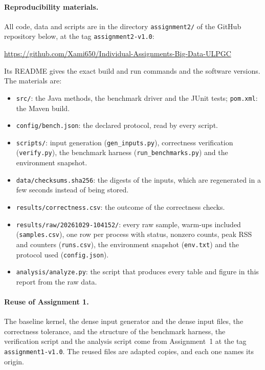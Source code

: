 \documentclass[11pt,a4paper]{article}
\newcommand{\repourl}{\url{https://github.com/Xami650/Individual-Assignments-Big-Data-ULPGC}}
\newcommand{\session}{\texttt{20261029-104152}}
\begin{document}
\paragraph{Reproducibility materials.} All code, data and scripts are in the
directory \texttt{assignment2/} of the GitHub repository below, at the tag
\texttt{assignment2-v1.0}:
\begin{center}\repourl\end{center}
Its README gives the exact build and run commands and the software versions.
The materials are:
\begin{itemize}
  \item \texttt{src/}: the Java methods, the benchmark driver and the JUnit tests;
  \texttt{pom.xml}: the Maven build.
  \item \texttt{config/bench.json}: the declared protocol, read by every script.
  \item \texttt{scripts/}: input generation (\texttt{gen\_inputs.py}),
  correctness verification (\texttt{verify.py}), the benchmark harness
  (\texttt{run\_benchmarks.py}) and the environment snapshot.
  \item \texttt{data/checksums.sha256}: the digests of the inputs, which are
  regenerated in a few seconds instead of being stored.
  \item \texttt{results/correctness.csv}: the outcome of the correctness checks.
  \item \texttt{results/raw/\session/}: every raw sample, warm-ups included
  (\texttt{samples.csv}), one row per process with status, nonzero counts, peak
  RSS and counters (\texttt{runs.csv}), the environment snapshot
  (\texttt{env.txt}) and the protocol used (\texttt{config.json}).
  \item \texttt{analysis/analyze.py}: the script that produces every table and
  figure in this report from the raw data.
\end{itemize}

\paragraph{Reuse of Assignment 1.} The baseline kernel, the dense input
generator and the dense input files, the correctness tolerance, and the
structure of the benchmark harness, the verification script and the analysis
script come from Assignment~1 at the tag \texttt{assignment1-v1.0}. The reused
files are adapted copies, and each one names its origin.
\end{document}
